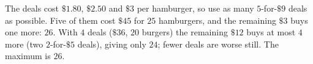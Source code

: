 The deals cost $\$1.80$, $\$2.50$ and $\$3$ per hamburger, so use as many $5$-for-$\$9$ deals as possible. Five of them cost $\$45$ for $25$ hamburgers, and the remaining $\$3$ buys one more: $26$. With $4$ deals ($\$36$, $20$ burgers) the remaining $\$12$ buys at most $4$ more (two $2$-for-$\$5$ deals), giving only $24$; fewer deals are worse still. The maximum is $\boxed{26}$.
